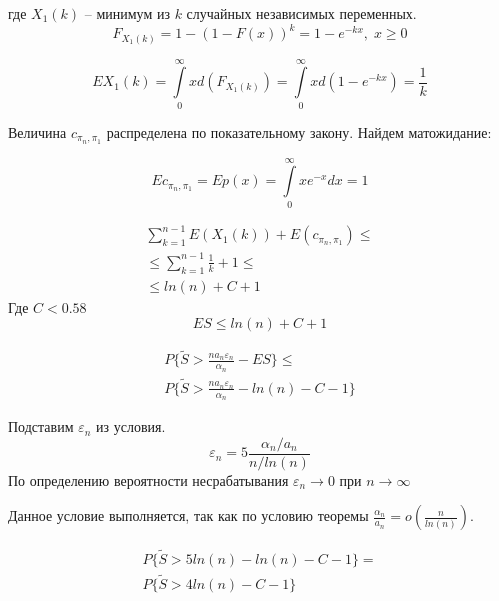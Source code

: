 \documentclass[a4paper, 14pt]{extarticle}
\numberwithin{equation}{section}
\begin{document}
где $X_1(k)$ -- минимум из $k$ случайных независимых переменных.
\begin{equation}
F_{X_1(k)} = 1 - (1-F(x))^k = 1 - e^{-kx}, \; x \geqslant 0
\end{equation}

\begin{equation}
EX_1(k) = \int\limits_0^\infty xd(F_{X_1(k)}) =\int\limits_0^\infty xd(1-e^{-kx}) = \frac{1}{k}
\end{equation}

Величина $c_{\pi_n, \pi_1}$ распределена по показательному закону. Найдем матожидание:

\begin{equation}
Ec_{\pi_n, \pi_1} = Ep(x) = \int\limits_0^\infty xe^{-x}dx = 1
\end{equation}

\begin{equation}
\begin{aligned}
\sum_{k=1}^{n-1} E(X_1(k)) + E(c_{\pi_n, \pi_1}) \leqslant \\
 \leqslant \sum_{k=1}^{n-1} \frac{1}{k} + 1 \leqslant \\
 \leqslant ln(n) + C + 1
\end{aligned}
\end{equation}
Где $C < 0.58$
\begin{equation}
ES \leqslant ln(n) + C + 1
\end{equation}

\begin{equation}
\begin{aligned}
P\{\tilde{S} >\frac{na_n\varepsilon_n}{\alpha_n} - ES  \} \leqslant \\
P\{\tilde{S} >\frac{na_n\varepsilon_n}{\alpha_n} - ln(n) - C - 1  \} \end{aligned}
\end{equation}

Подставим $\varepsilon_n$ из условия.
\begin{equation}
\varepsilon_n = 5 \frac{\alpha_n/a_n}{n/ln(n)}
\end{equation}
По определению вероятности несрабатывания $\varepsilon_n \rightarrow 0$ при $n \rightarrow \infty$

Данное условие выполняется, так как по условию теоремы $\frac{\alpha_n}{a_n} = o(\frac{n}{ln(n)})$.

\begin{equation}
\begin{aligned}
P\{\tilde{S} >5ln(n) - ln(n) - C - 1  \} = \\
P\{\tilde{S} >4ln(n) - C - 1  \}
\end{aligned}
\end{equation}
\end{document}
